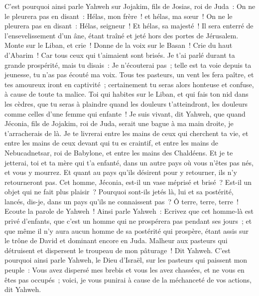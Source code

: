 \begin{multicols}{2}
C'est pourquoi ainsi parle Yahweh sur Jojakim, fils de Josias, roi de Juda~: On ne le pleurera pas en disant~: Hélas, mon frère~! et hélas, ma sœur~! On ne le pleurera pas en disant~: Hélas, seigneur~! Et hélas, sa majesté~!
Il sera enterré de l'ensevelissement d'un âne, étant traîné et jeté hors des portes de Jérusalem.
Monte sur le Liban, et crie~! Donne de la voix sur le Basan~! Crie du haut d'Abarim~! Car tous ceux qui t'aimaient sont brisés.
Je t'ai parlé durant ta grande prospérité, mais tu disais~: Je n'écouterai pas~; telle est ta voie depuis ta jeunesse, tu n'as pas écouté ma voix.
Tous tes pasteurs, un vent les fera paître, et tes amoureux iront en captivité~; certainement tu seras alors honteuse et confuse, à cause de toute ta malice.
Toi qui habites sur le Liban, et qui fais ton nid dans les cèdres, que tu seras à plaindre quand les douleurs t'atteindront, les douleurs comme celles d'une femme qui enfante~!
Je suis vivant, dit Yahweh, que quand Jéconia, fils de Jojakim, roi de Juda, serait une bague à ma main droite, je t'arracherais de là.
Je te livrerai entre les mains de ceux qui cherchent ta vie, et entre les mains de ceux devant qui tu es craintif, et entre les mains de Nebucadnetsar, roi de Babylone, et entre les mains des Chaldéens.
Et je te jetterai, toi et ta mère qui t'a enfanté, dans un autre pays où vous n'êtes pas nés, et vous y mourrez.
Et quant au pays qu'ils désirent pour y retourner, ils n'y retourneront pas.
Cet homme, Jéconia, est-il un vase méprisé et brisé~? Est-il un objet qui ne fait plus plaisir~? Pourquoi sont-ils jetés là, lui et sa postérité, lancés, dis-je, dans un pays qu'ils ne connaissent pas~?
Ô terre, terre, terre~! Ecoute la parole de Yahweh~!
Ainsi parle Yahweh~: Ecrivez que cet homme-là est privé d'enfants, que c'est un homme qui ne prospérera pas pendant ses jours~; et que même il n'y aura aucun homme de sa postérité qui prospère, étant assis sur le trône de David et dominant encore en Juda.
\VerseOne{}Malheur aux pasteurs qui détruisent et dispersent le troupeau de mon pâturage~! Dit Yahweh.
C'est pourquoi ainsi parle Yahweh, le Dieu d'Israël, sur les pasteurs qui paissent mon peuple~: Vous avez dispersé mes brebis et vous les avez chassées, et ne vous en êtes pas occupés~; voici, je vous punirai à cause de la méchanceté de vos actions, dit Yahweh.

\end{multicols}
